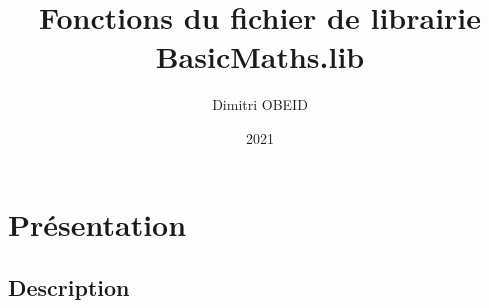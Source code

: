 \documentclass[a4paper,10pt]{article}
\title{\color{sec1}Fonctions du fichier de librairie \color{path}BasicMaths.lib}\color{text}
\author{Dimitri OBEID}
\date{2021}
\begin{document}
    \maketitle
    \newpage

    \hypertarget{contents}{}
    \tableofcontents
    \newpage

    \color{sec1}
    \section{Présentation}\color{text}

    \color{sec2}
    \subsection{Description}\color{text}
\end{document}
